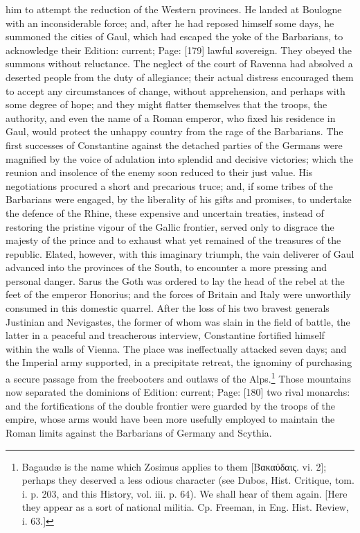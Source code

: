 him to attempt the reduction of the Western provinces. He landed at Boulogne with an inconsiderable force; and, after he had reposed himself some days, he summoned the cities of Gaul, which had escaped the yoke of the Barbarians, to acknowledge their Edition: current; Page: [179] lawful sovereign. They obeyed the summons without reluctance. The neglect of the court of Ravenna had absolved a deserted people from the duty of allegiance; their actual distress encouraged them to accept any circumstances of change, without apprehension, and perhaps with some degree of hope; and they might flatter themselves that the troops, the authority, and even the name of a Roman emperor, who fixed his residence in Gaul, would protect the unhappy country from the rage of the Barbarians. The first successes of Constantine against the detached parties of the Germans were magnified by the voice of adulation into splendid and decisive victories; which the reunion and insolence of the enemy soon reduced to their just value. His negotiations procured a short and precarious truce; and, if some tribes of the Barbarians were engaged, by the liberality of his gifts and promises, to undertake the defence of the Rhine, these expensive and uncertain treaties, instead of restoring the pristine vigour of the Gallic frontier, served only to disgrace the majesty of the prince and to exhaust what yet remained of the treasures of the republic. Elated, however, with this imaginary triumph, the vain deliverer of Gaul advanced into the provinces of the South, to encounter a more pressing and personal danger. Sarus the Goth was ordered to lay the head of the rebel at the feet of the emperor Honorius; and the forces of Britain and Italy were unworthily consumed in this domestic quarrel. After the loss of his two bravest generals Justinian and Nevigastes, the former of whom was slain in the field of battle, the latter in a peaceful and treacherous interview, Constantine fortified himself within the walls of Vienna. The place was ineffectually attacked seven days; and the Imperial army supported, in a precipitate retreat, the ignominy of purchasing a secure passage from the freebooters and outlaws of the Alps.\footnote{Bagaudæ is the name which Zosimus applies to them [\textgreek{Βακαύδαις}. vi. 2]; perhaps they deserved a less odious character (see Dubos, Hist. Critique, tom. i. p. 203, and this History, vol. iii. p. 64). We shall hear of them again. [Here they appear as a sort of national militia. Cp. Freeman, in Eng. Hist. Review, i. 63.]} Those mountains now separated the dominions of Edition: current; Page: [180] two rival monarchs: and the fortifications of the double frontier were guarded by the troops of the empire, whose arms would have been more usefully employed to maintain the Roman limits against the Barbarians of Germany and Scythia.

